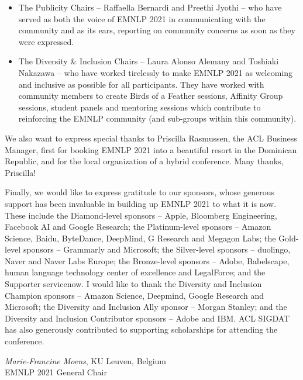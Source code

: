 \begin{itemize}
\item The Publicity Chairs -- Raffaella Bernardi and Preethi Jyothi -- who have served as both the voice of EMNLP 2021 in communicating with the community and as its ears, reporting on community concerns as soon as they were expressed.
\item The Diversity & Inclusion Chairs -- Laura Alonso Alemany and Toshiaki Nakazawa -- who have worked tirelessly to make EMNLP 2021 as welcoming and inclusive as possible for all participants. They have worked with community members to create Birds of a Feather sessions, Affinity Group sessions, student panels and mentoring sessions which contribute to reinforcing the EMNLP community (and sub-groups within this community).
\end{itemize}

We also want to express special thanks to Priscilla Rasmussen, the ACL Business Manager, first for booking EMNLP 2021 into a beautiful resort in the Dominican Republic, and for the local organization of a hybrid conference. Many thanks, Priscilla!

Finally, we would like to express gratitude to our sponsors, whose generous support has been invaluable in building up EMNLP 2021 to what it is now. These include the Diamond-level sponsors -- Apple, Bloomberg Engineering, Facebook AI and Google Research; the Platinum-level sponsors -- Amazon Science, Baidu, ByteDance, DeepMind, G Research and Megagon Labs; the Gold-level sponsors -- Grammarly and Microsoft; the Silver-level sponsors -- duolingo, Naver and Naver Labs Europe; the Bronze-level sponsors -- Adobe, Babelscape, human language technology center of excellence and LegalForce; and the Supporter servicenow. I would like to thank the Diversity and Inclusion Champion sponsors -- Amazon Science, Deepmind, Google Research and Microsoft; the Diversity and Inclusion Ally sponsor -- Morgan Stanley; and the Diversity and Inclusion Contributor sponsors -- Adobe and IBM. ACL SIGDAT has also generously contributed to supporting scholarships for attending the conference.

\vspace{3em}

\noindent \textit{Marie-Francine Moens}, KU Leuven, Belgium \\
\noindent EMNLP 2021 General Chair \\

